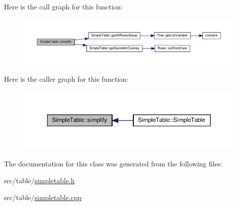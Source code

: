 Here is the call graph for this function\+:\nopagebreak
\begin{figure}[H]
\begin{center}
\leavevmode
\includegraphics[width=350pt]{d0/d52/class_simple_table_ad94b85aed20f08c4513394cec5d11fe1_cgraph}
\end{center}
\end{figure}
Here is the caller graph for this function\+:\nopagebreak
\begin{figure}[H]
\begin{center}
\leavevmode
\includegraphics[width=350pt]{d0/d52/class_simple_table_ad94b85aed20f08c4513394cec5d11fe1_icgraph}
\end{center}
\end{figure}


The documentation for this class was generated from the following files\+:\begin{DoxyCompactItemize}
\item 
src/table/\hyperlink{simpletable_8h}{simpletable.\+h}\item 
src/table/\hyperlink{simpletable_8cpp}{simpletable.\+cpp}\end{DoxyCompactItemize}
